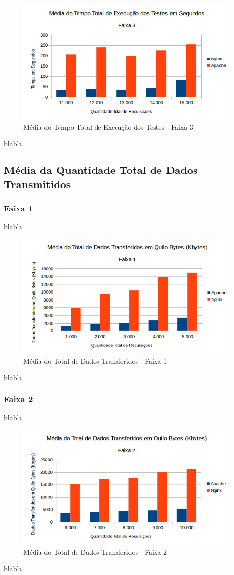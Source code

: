 \begin{figure}[htb]
	\centering
	\includegraphics[width=0.6\linewidth]{graficos/grafico1-f3} 
	\caption{Média do Tempo Total de Execução dos Testes - Faixa 3}
	\label{fig:grafico1-f3}
\end{figure}
blabla


\subsection{Média da Quantidade Total de Dados Transmitidos}
\subsubsection{Faixa 1}

blabla
\begin{figure}[htb]
	\centering
	\includegraphics[width=0.6\linewidth]{graficos/grafico2-f1} 
	\caption{Média do Total de Dados Transferidos - Faixa 1}
	\label{fig:grafico2-f1}
\end{figure}

blabla

\subsubsection{Faixa 2}
blabla

\begin{figure}[htb]
	\centering
	\includegraphics[width=0.6\linewidth]{graficos/grafico2-f2} 
	\caption{Média do Total de Dados Transferidos - Faixa 2}
	\label{fig:grafico2-f2}
\end{figure}
blabla

